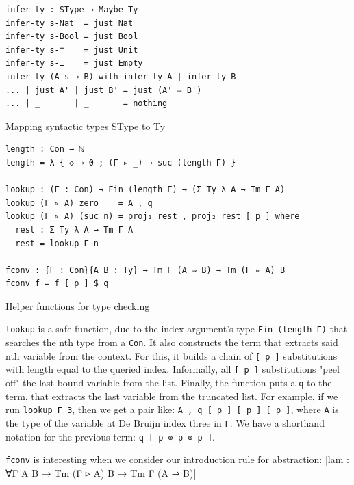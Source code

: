 \begin{listing}[H]
\begin{verbatim}
infer-ty : SType → Maybe Ty
infer-ty s-Nat  = just Nat
infer-ty s-Bool = just Bool
infer-ty s-⊤    = just Unit
infer-ty s-⊥    = just Empty
infer-ty (A s-→ B) with infer-ty A | infer-ty B
... | just A' | just B' = just (A' ⇒ B')
... | _       | _       = nothing
\end{verbatim}
\caption{Mapping syntactic types SType to Ty}
\label{code:typecheck-infer-ty}
\end{listing}

\begin{listing}[H]
\begin{verbatim}
length : Con → ℕ
length = λ { ◇ → 0 ; (Γ ▹ _) → suc (length Γ) }

lookup : (Γ : Con) → Fin (length Γ) → (Σ Ty λ A → Tm Γ A)
lookup (Γ ▹ A) zero    = A , q
lookup (Γ ▹ A) (suc n) = proj₁ rest , proj₂ rest [ p ] where
  rest : Σ Ty λ A → Tm Γ A
  rest = lookup Γ n

fconv : {Γ : Con}{A B : Ty} → Tm Γ (A ⇒ B) → Tm (Γ ▹ A) B
fconv f = f [ p ] $ q
\end{verbatim}
\caption{Helper functions for type checking}
\label{code:typecheck-helpers}
\end{listing}

\verb$lookup$ is a safe function, due to the index argument's type \verb$Fin (length Γ)$ that searches the nth type from a \verb$Con$. It also constructs the term that extracts said nth variable from the context. For this, it builds a chain of \verb$[ p ]$ substitutions with length equal to the queried index. Informally, all \verb$[ p ]$ substitutions "peel off" the last bound variable from the list. Finally, the function puts a \verb$q$ to the term, that extracts the last variable from the truncated list. For example, if we run \verb$lookup Γ 3$, then we get a pair like: \verb$A , q [ p ] [ p ] [ p ]$, where \verb$A$ is the type of the variable at De Bruijn index three in \verb$Γ$. We have a shorthand notation for the previous term: \verb$q [ p ⊚ p ⊚ p ]$.

\verb$fconv$ is interesting when we consider our introduction rule for abstraction:
|lam : ∀{Γ A B} → Tm (Γ ▹ A) B → Tm Γ (A ⇒ B)|


